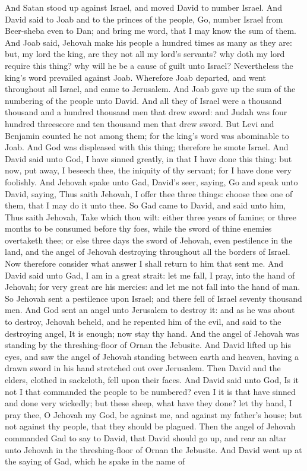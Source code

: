 And Satan stood up against Israel, and moved David to number Israel. And David said to Joab and to the princes of the people, Go, number Israel from Beer-sheba even to Dan; and bring me word, that I may know the sum of them. And Joab said, Jehovah make his people a hundred times as many as they are: but, my lord the king, are they not all my lord’s servants? why doth my lord require this thing? why will he be a cause of guilt unto Israel? Nevertheless the king’s word prevailed against Joab. Wherefore Joab departed, and went throughout all Israel, and came to Jerusalem. And Joab gave up the sum of the numbering of the people unto David. And all they of Israel were a thousand thousand and a hundred thousand men that drew sword: and Judah was four hundred threescore and ten thousand men that drew sword. But Levi and Benjamin counted he not among them; for the king’s word was abominable to Joab. And God was displeased with this thing; therefore he smote Israel. And David said unto God, I have sinned greatly, in that I have done this thing: but now, put away, I beseech thee, the iniquity of thy servant; for I have done very foolishly.  And Jehovah spake unto Gad, David’s seer, saying, Go and speak unto David, saying, Thus saith Jehovah, I offer thee three things: choose thee one of them, that I may do it unto thee. So Gad came to David, and said unto him, Thus saith Jehovah, Take which thou wilt: either three years of famine; or three months to be consumed before thy foes, while the sword of thine enemies overtaketh thee; or else three days the sword of Jehovah, even pestilence in the land, and the angel of Jehovah destroying throughout all the borders of Israel. Now therefore consider what answer I shall return to him that sent me. And David said unto Gad, I am in a great strait: let me fall, I pray, into the hand of Jehovah; for very great are his mercies: and let me not fall into the hand of man. So Jehovah sent a pestilence upon Israel; and there fell of Israel seventy thousand men. And God sent an angel unto Jerusalem to destroy it: and as he was about to destroy, Jehovah beheld, and he repented him of the evil, and said to the destroying angel, It is enough; now stay thy hand. And the angel of Jehovah was standing by the threshing-floor of Ornan the Jebusite. And David lifted up his eyes, and saw the angel of Jehovah standing between earth and heaven, having a drawn sword in his hand stretched out over Jerusalem. Then David and the elders, clothed in sackcloth, fell upon their faces. And David said unto God, Is it not I that commanded the people to be numbered? even I it is that have sinned and done very wickedly; but these sheep, what have they done? let thy hand, I pray thee, O Jehovah my God, be against me, and against my father’s house; but not against thy people, that they should be plagued.  Then the angel of Jehovah commanded Gad to say to David, that David should go up, and rear an altar unto Jehovah in the threshing-floor of Ornan the Jebusite. And David went up at the saying of Gad, which he spake in the name of 